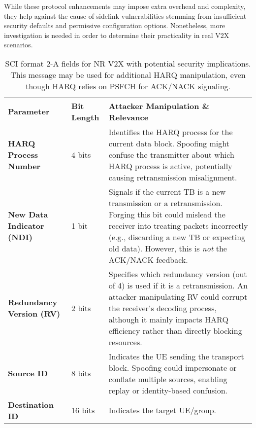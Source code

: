 While these protocol enhancements may impose extra overhead and complexity, they help against the cause of sidelink vulnerabilities stemming from insufficient security defaults and permissive configuration options. Nonetheless, more investigation is needed in order to determine their practicality in real V2X scenarios.

\begin{table*}[!t]
\centering
\caption{SCI format 2-A fields for NR V2X with potential security implications. This message may be used for additional HARQ manipulation, even though HARQ relies on PSFCH for ACK/NACK signaling.}
\label{tab:sci2a-format}
\renewcommand{\arraystretch}{1.3}
\small
\begin{tabularx}{\textwidth}{l l X}
\toprule
\textbf{Parameter} & \textbf{Bit Length} & \textbf{Attacker Manipulation \& Relevance} \\
\midrule

\textbf{HARQ Process Number} &
4 bits &
Identifies the HARQ process for the current data block. Spoofing might confuse the transmitter about which HARQ process is active, potentially causing retransmission misalignment. \\

\midrule

\textbf{New Data Indicator (NDI)} &
1 bit &
Signals if the current TB is a new transmission or a retransmission. Forging this bit could mislead the receiver into treating packets incorrectly (e.g., discarding a new TB or expecting old data). However, this is \emph{not} the ACK/NACK feedback. \\

\midrule

\textbf{Redundancy Version (RV)} &
2 bits &
Specifies which redundancy version (out of 4) is used if it is a retransmission. An attacker manipulating RV could corrupt the receiver’s decoding process, although it mainly impacts HARQ efficiency rather than directly blocking resources. \\

\midrule

\textbf{Source ID} &
8 bits &
Indicates the UE sending the transport block. Spoofing could impersonate or conflate multiple sources, enabling replay or identity-based confusion. \\

\midrule

\textbf{Destination ID} &
16 bits &
Indicates the target UE/group. \\


\end{tabularx}
\end{table*}

